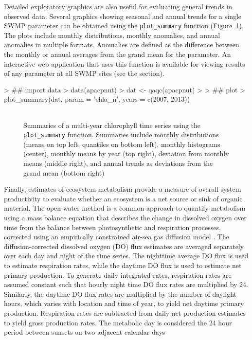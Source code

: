 Detailed exploratory graphics are also useful for evaluating general trends in observed data.  Several graphics showing seasonal and annual trends for a single SWMP parameter can be obtained using the \texttt{plot\_summary} function (Figure~\ref{fig:summary_ex}).  The plots include monthly distributions, monthly anomalies, and annual anomalies in multiple formats.  Anomalies are defined as the difference between the monthly or annual averages from the grand mean for the parameter.  An interactive web application \cite{Chang15} that uses this function is available for viewing results of any parameter at all SWMP sites (see the  section).

\begin{example}
> ## import data
> data(apacpnut)
> dat <- qaqc(apacpnut)
> 
> ## plot
> plot_summary(dat, param = 'chla_n', years = c(2007, 2013))
\end{example}

\begin{figure}[!h]

{\centering \includegraphics[width=0.00\textwidth]{figure/summary_ex-1} 

}

\caption[Summaries of a multi-year chlorophyll time series using the \texttt{plot\_summary} function]{Summaries of a multi-year chlorophyll time series using the \texttt{plot\_summary} function.  Summaries include monthly distributions (means on top left, quantiles on bottom left), monthly histograms (center), monthly means by year (top right), deviation from monthly means (middle right), and annual trends as deviations from the grand mean (bottom right)}\label{fig:summary_ex}
\end{figure}

Finally, estimates of ecosystem metabolism provide a measure of overall system productivity to evaluate whether an ecosystem is a net source or sink of organic material.  The open-water method \cite{Odum56} is a common approach to quantify metabolism using a mass balance equation that describes the change in dissolved oxygen over time from the balance between photosynthetic and respiration processes, corrected using an empirically constrained air-sea gas diffusion model \cite{Ro06,Thebault08}. The diffusion-corrected dissolved oxygen (DO) flux estimates are averaged separately over each day and night of the time series. The nighttime average DO flux is used to estimate respiration rates, while the daytime DO flux is used to estimate net primary production. To generate daily integrated rates, respiration rates are assumed constant such that hourly night time DO flux rates are multiplied by 24. Similarly, the daytime DO flux rates are multiplied by the number of daylight hours, which varies with location and time of year, to yield net daytime primary production. Respiration rates are subtracted from daily net production estimates to yield gross production rates. The metabolic day is considered the 24 hour period between sunsets on two adjacent calendar days  

